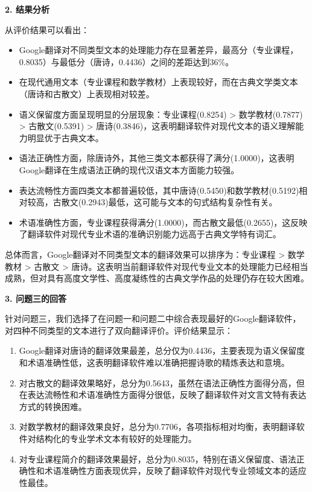 \documentclass[bwprint]{cumcmthesis}
\begin{document}
\textbf{2. 结果分析}

从评价结果可以看出：

\begin{itemize}
    \item Google翻译对不同类型文本的处理能力存在显著差异，最高分（专业课程，0.8035）与最低分（唐诗，0.4436）之间的差距达到36\%。
    
    \item 在现代通用文本（专业课程和数学教材）上表现较好，而在古典文学类文本（唐诗和古散文）上表现相对较差。
    
    \item 语义保留度方面呈现明显的分层现象：专业课程(0.8254) > 数学教材(0.7877) > 古散文(0.5391) > 唐诗(0.3846)，这表明翻译软件对现代文本的语义理解能力明显优于古典文本。
    
    \item 语法正确性方面，除唐诗外，其他三类文本都获得了满分(1.0000)，这表明Google翻译在生成语法正确的现代汉语文本方面能力较强。
    
    \item 表达流畅性方面四类文本都普遍较低，其中唐诗(0.5450)和数学教材(0.5192)相对较高，古散文(0.2943)最低，这可能与文本的句式结构复杂性有关。
    
    \item 术语准确性方面，专业课程获得满分(1.0000)，而古散文最低(0.2655)，这反映了翻译软件对现代专业术语的准确识别能力远高于古典文学特有词汇。
\end{itemize}

总体而言，Google翻译对不同类型文本的翻译效果可以排序为：专业课程 > 数学教材 > 古散文 > 唐诗。这表明当前翻译软件对现代专业文本的处理能力已经相当成熟，但对具有高度文学性、高度凝练性的古典文学作品的处理仍存在较大困难。

\textbf{3. 问题三的回答}

针对问题三，我们选择了在问题一和问题二中综合表现最好的Google翻译软件，对四种不同类型的文本进行了双向翻译评价。评价结果显示：

\begin{enumerate}
    \item Google翻译对唐诗的翻译效果最差，总分仅为0.4436，主要表现为语义保留度和术语准确性低，这表明翻译软件难以准确把握诗歌的精炼表达和意境。
    
    \item 对古散文的翻译效果略好，总分为0.5643，虽然在语法正确性方面得分高，但在表达流畅性和术语准确性方面得分很低，反映了翻译软件对文言文特有表达方式的转换困难。
    
    \item 对数学教材的翻译效果良好，总分为0.7706，各项指标相对均衡，表明翻译软件对结构化的专业学术文本有较好的处理能力。
    
    \item 对专业课程简介的翻译效果最好，总分为0.8035，特别在语义保留度、语法正确性和术语准确性方面表现优异，反映了翻译软件对现代专业领域文本的适应性最佳。
\end{enumerate}
\end{document}

